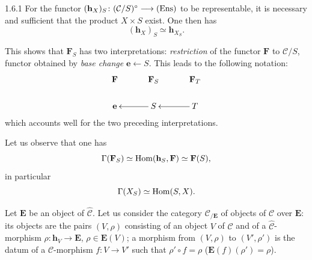 \begin{proposition}{1.6.1}
\label{I.1.6.1}
For the functor
\((\mathbf{h}_{X})_{S}\colon(\mathcal{C}/S)^{\circ}\longrightarrow\textup{(Ens)}\)
to be representable, it is necessary and sufficient that the product
\(X\times S\) exist. One then has
\[
(\mathbf{h}_{X})_{S}\simeq\mathbf{h}_{X_{S}}.
\]
\end{proposition}

This shows that \(\mathbf{F}_{S}\) has two interpretations:
\emph{restriction} of the functor \(\mathbf{F}\) to \(\mathcal{C}/S\),
functor obtained by \emph{base change} \(\mathbf{e}\leftarrow S\). This
leads to the following notation:
\[
\xymatrix@R=1.8em@C=3em{
\mathbf{F} & \mathbf{F}_{S} & \mathbf{F}_{T}\\
\mathbf{e} & S\ar[l] & T\ar[l]
}
\]
which accounts well for the two preceding interpretations.

Let us observe that one has
\[
\Gamma(\mathbf{F}_{S})\simeq\operatorname{Hom}(\mathbf{h}_{S},\mathbf{F})\simeq\mathbf{F}(S),
\]
in particular
\[
\Gamma(X_{S})\simeq\operatorname{Hom}(S,X).
\]

{\renewcommand{\thefootnote}{(13)}}%
Let \(\mathbf{E}\) be an object of \(\widehat{\mathcal{C}}\). Let us
consider the category \(\mathcal{C}_{/\mathbf{E}}\) of objects of
\(\mathcal{C}\) over \(\mathbf{E}\): its objects are the pairs
\((V,\rho)\) consisting of an object \(V\) of \(\mathcal{C}\) and of a
\(\widehat{\mathcal{C}}\)-morphism
\(\rho\colon\mathbf{h}_{V}\to\mathbf{E}\), \ie
\(\rho\in\mathbf{E}(V)\); a morphism from \((V,\rho)\) to
\((V',\rho')\) is the datum of a \(\mathcal{C}\)-morphism
\(f\colon V\to V'\) such that \(\rho'\circ f=\rho\)
(\ie \(\mathbf{E}(f)(\rho')=\rho\)).
